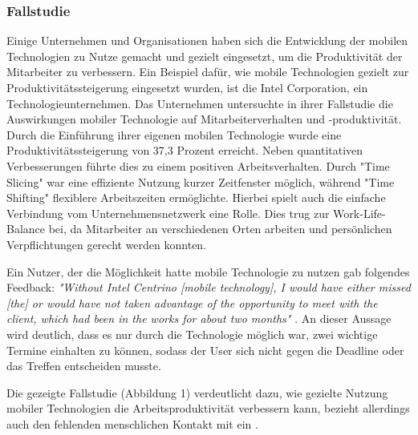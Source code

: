 \documentclass[12pt,a4paper]{article}
\begin{document}
\subsubsection*{Fallstudie}
Einige Unternehmen und Organisationen haben sich die Entwicklung der mobilen Technologien zu Nutze gemacht und gezielt eingesetzt, um die Produktivität der Mitarbeiter zu verbessern. Ein Beispiel dafür, wie mobile Technologien gezielt zur Produktivitätssteigerung eingesetzt wurden, ist die Intel Corporation, ein Technologieunternehmen. Das Unternehmen untersuchte in ihrer Fallstudie die Auswirkungen mobiler Technologie auf Mitarbeiterverhalten und -produktivität. Durch die Einführung ihrer eigenen mobilen Technologie wurde eine Produktivitätssteigerung von 37,3 Prozent erreicht. Neben quantitativen Verbesserungen führte dies zu einem positiven Arbeitsverhalten. Durch "Time Slicing" war eine effiziente Nutzung kurzer Zeitfenster möglich, während "Time Shifting" flexiblere Arbeitszeiten ermöglichte. Hierbei spielt auch die einfache Verbindung vom Unternehmensnetzwerk eine Rolle. Dies trug zur Work-Life-Balance bei, da Mitarbeiter an verschiedenen Orten arbeiten und persönlichen Verpflichtungen gerecht werden konnten. 

	Ein Nutzer, der die Möglichkeit hatte mobile Technologie zu nutzen gab folgendes Feedback: 
	\emph{"Without Intel Centrino [mobile technology], I would have either missed [the] or would have not taken advantage of the opportunity to meet with the client, which had been in the works for about two months"}  \parencite{govindaraju2005effects}. An dieser Aussage wird deutlich, dass es nur durch die Technologie möglich war, zwei wichtige Termine einhalten zu können, sodass der User sich nicht gegen die Deadline oder das Treffen entscheiden musste.

	Die gezeigte Fallstudie (Abbildung 1) verdeutlicht dazu, wie gezielte Nutzung mobiler Technologien die Arbeitsproduktivität verbessern kann, bezieht allerdings auch den fehlenden menschlichen Kontakt mit ein \parencite[vgl.][]{govindaraju2005effects}.
\end{document}
